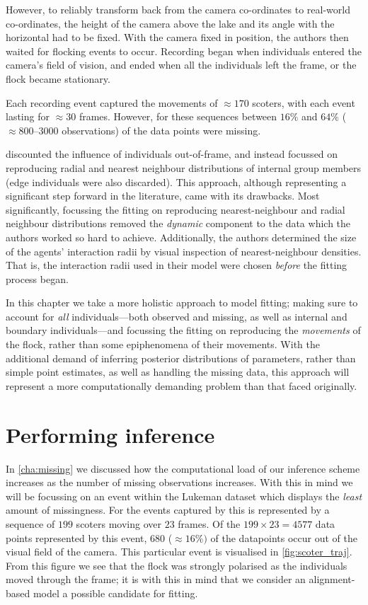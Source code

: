 However, to reliably transform back from the camera co-ordinates to real-world
co-ordinates, the height of the camera above the lake and its angle with the
horizontal had to be fixed. With the camera fixed in position, the authors then
waited for flocking events to occur. Recording began when individuals entered
the camera's field of vision, and ended when all the individuals left the
frame, or the flock became stationary.

Each recording event captured the movements of $\approx170$ scoters, with each
event lasting for $\approx30$ frames. However, for these sequences between
$16\%$ and $64\%$ ($\approx800$--$3000$ observations) of the data points were
missing.

\textcite{lukeman10} discounted the influence of individuals out-of-frame, and
instead focussed on reproducing radial and nearest neighbour distributions of
internal group members (edge individuals were also discarded). This approach,
although representing a significant step forward in the literature, came with
its drawbacks. Most significantly, focussing the fitting on reproducing
nearest-neighbour and radial neighbour distributions removed the \emph{dynamic}
component to the data which the authors worked so hard to achieve.
Additionally, the authors determined the size of the agents' interaction radii
by visual inspection of nearest-neighbour densities. That is, the interaction
radii used in their model were chosen \emph{before} the fitting process began.

In this chapter we take a more holistic approach to model fitting; making sure
to account for \emph{all} individuals---both observed and missing, as well as
internal and boundary individuals---and focussing the fitting on reproducing
the \emph{movements} of the flock, rather than some epiphenomena of their
movements. With the additional demand of inferring posterior distributions of
parameters, rather than simple point estimates, as well as handling the missing
data, this approach will represent a more computationally demanding problem
than that faced originally.

\section{Performing inference}

In \cref{cha:missing} we discussed how the computational load of our inference
scheme increases as the number of missing observations increases. With this in
mind we will be focussing on an event within the Lukeman dataset which displays
the \emph{least} amount of missingness. For the events captured by
\textcite{lukeman10} this is represented by a sequence of $199$ scoters moving
over $23$ frames. Of the $199\times23=4577$ data points represented by this
event, $680$ ($\approx16\%)$ of the datapoints occur out of the visual field of
the camera. This particular event is visualised in \cref{fig:scoter_traj}. From
this figure we see that the flock was strongly polarised as the individuals
moved through the frame; it is with this in mind that we consider an
alignment-based model a possible candidate for fitting.

